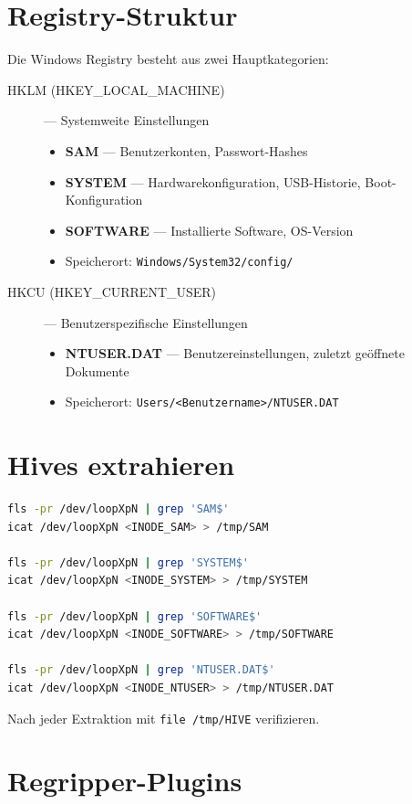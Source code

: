 \section{Registry-Struktur}

Die Windows Registry besteht aus zwei Hauptkategorien:

\begin{description}
    \item[HKLM (HKEY\_LOCAL\_MACHINE)] — Systemweite Einstellungen
    \begin{itemize}
        \item \textbf{SAM} — Benutzerkonten, Passwort-Hashes
        \item \textbf{SYSTEM} — Hardwarekonfiguration, USB-Historie, Boot-Konfiguration
        \item \textbf{SOFTWARE} — Installierte Software, OS-Version
        \item Speicherort: \texttt{Windows/System32/config/}
    \end{itemize}
    \item[HKCU (HKEY\_CURRENT\_USER)] — Benutzerspezifische Einstellungen
    \begin{itemize}
        \item \textbf{NTUSER.DAT} — Benutzereinstellungen, zuletzt geöffnete Dokumente
        \item Speicherort: \texttt{Users/<Benutzername>/NTUSER.DAT}
    \end{itemize}
\end{description}

\section{Hives extrahieren}

\begin{lstlisting}[language=bash]
fls -pr /dev/loopXpN | grep 'SAM$'
icat /dev/loopXpN <INODE_SAM> > /tmp/SAM

fls -pr /dev/loopXpN | grep 'SYSTEM$'
icat /dev/loopXpN <INODE_SYSTEM> > /tmp/SYSTEM

fls -pr /dev/loopXpN | grep 'SOFTWARE$'
icat /dev/loopXpN <INODE_SOFTWARE> > /tmp/SOFTWARE

fls -pr /dev/loopXpN | grep 'NTUSER.DAT$'
icat /dev/loopXpN <INODE_NTUSER> > /tmp/NTUSER.DAT
\end{lstlisting}

Nach jeder Extraktion mit \texttt{file /tmp/HIVE} verifizieren.

\section{Regripper-Plugins}


